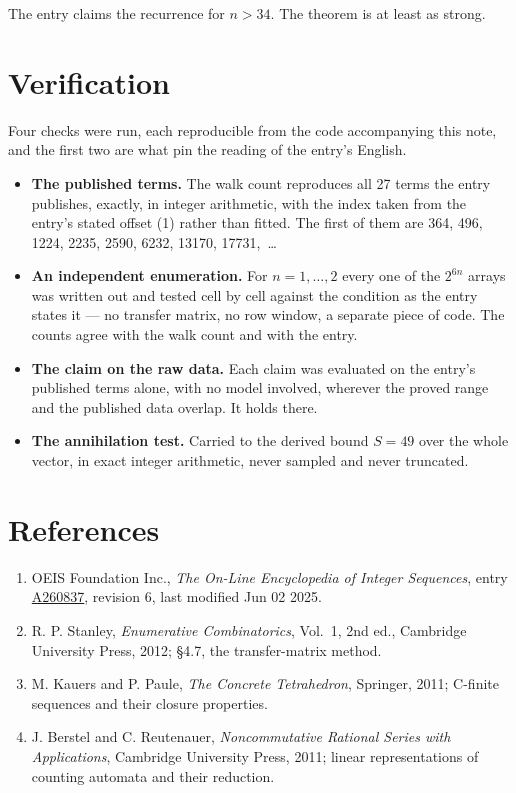 \documentclass[11pt]{article}
\theoremstyle{definition}
\begin{document}
The entry claims the recurrence for $n > 34$. The theorem is at least as strong.

\section{Verification}

Four checks were run, each reproducible from the code accompanying this note, and the first two are what pin the reading of the entry's English.

\begin{itemize}

\item {\bfseries The published terms.} The walk count reproduces all 27 terms the entry publishes, exactly, in integer arithmetic, with the index taken from the entry's stated offset (1) rather than fitted. The first of them are 364, 496, 1224, 2235, 2590, 6232, 13170, 17731,~\dots

\item {\bfseries An independent enumeration.} For $n = 1,\dots,2$ every one of the $2^{6n}$ arrays was written out and tested cell by cell against the condition as the entry states it --- no transfer matrix, no row window, a separate piece of code. The counts agree with the walk count and with the entry.

\item {\bfseries The claim on the raw data.} Each claim was evaluated on the entry's published terms alone, with no model involved, wherever the proved range and the published data overlap. It holds there.

\item {\bfseries The annihilation test.} Carried to the derived bound $S = 49$ over the whole vector, in exact integer arithmetic, never sampled and never truncated.

\end{itemize}

\section{References}

\begin{enumerate}

\item OEIS Foundation Inc., \emph{The On-Line Encyclopedia of Integer Sequences}, entry \href{https://oeis.org/A260837}{A260837}, revision 6, last modified Jun 02 2025.

\item R. P. Stanley, \emph{Enumerative Combinatorics}, Vol.~1, 2nd ed., Cambridge University Press, 2012; \S4.7, the transfer-matrix method.

\item M. Kauers and P. Paule, \emph{The Concrete Tetrahedron}, Springer, 2011; C-finite sequences and their closure properties.

\item J. Berstel and C. Reutenauer, \emph{Noncommutative Rational Series with Applications}, Cambridge University Press, 2011; linear representations of counting automata and their reduction.

\end{enumerate}
\end{document}
